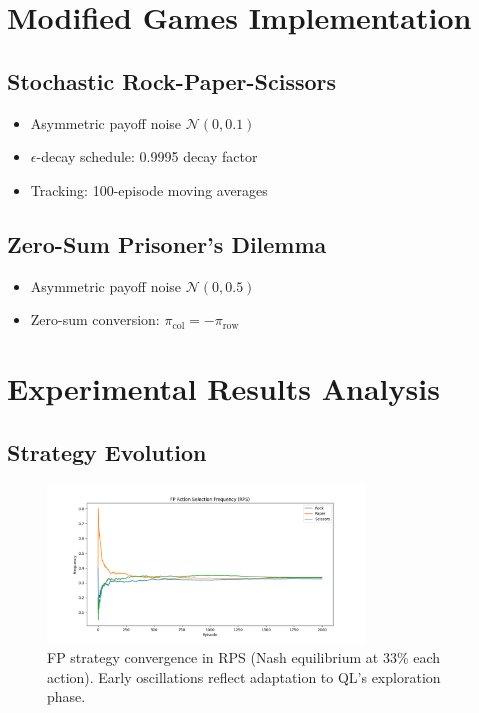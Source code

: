 \documentclass{article}
\begin{document}
\section{Modified Games Implementation}
\subsection{Stochastic Rock-Paper-Scissors}
\begin{itemize}
\item Asymmetric payoff noise $\mathcal{N}(0,0.1)$
\item $\epsilon$-decay schedule: 0.9995 decay factor
\item Tracking: 100-episode moving averages
\end{itemize}

\subsection{Zero-Sum Prisoner's Dilemma}
\begin{itemize}
\item Asymmetric payoff noise $\mathcal{N}(0,0.5)$
\item Zero-sum conversion: $\pi_{\text{col}} = -\pi_{\text{row}}$
\end{itemize}

\section{Experimental Results Analysis}
\subsection{Strategy Evolution}
\begin{figure}[H]
\centering
\includegraphics[width=0.75\textwidth]{rps_fp_strategy.png}
\caption{FP strategy convergence in RPS (Nash equilibrium at 33\% each action). Early oscillations reflect adaptation to QL's exploration phase.}
\label{fig:fp_strat}
\end{figure}
\end{document}
